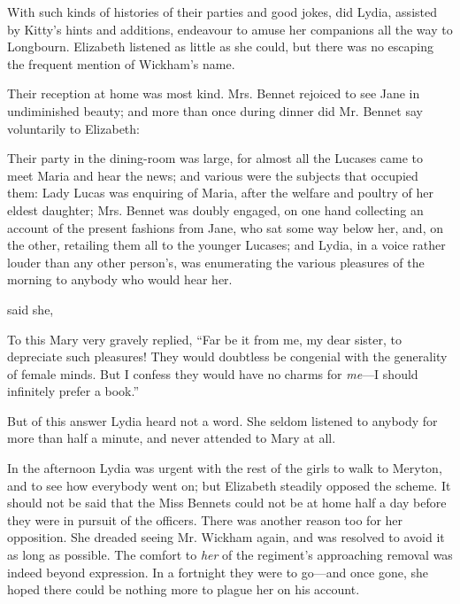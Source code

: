With such kinds of histories of their parties and good jokes, did Lydia, assisted by Kitty's hints and additions, endeavour to amuse her companions all the way to Longbourn. Elizabeth listened as little as she could, but there was no escaping the frequent mention of Wickham's name.

Their reception at home was most kind. Mrs. Bennet rejoiced to see Jane in undiminished beauty; and more than once during dinner did Mr. Bennet say voluntarily to Elizabeth:


Their party in the dining-room was large, for almost all the Lucases came to meet Maria and hear the news; and various were the subjects that occupied them: Lady Lucas was enquiring of Maria, after the welfare and poultry of her eldest daughter; Mrs. Bennet was doubly engaged, on one hand collecting an account of the present fashions from Jane, who sat some way below her, and, on the other, retailing them all to the younger Lucases; and Lydia, in a voice rather louder than any other person's, was enumerating the various pleasures of the morning to anybody who would hear her.

 said she, 

To this Mary very gravely replied, “Far be it from me, my dear sister, to depreciate such pleasures! They would doubtless be congenial with the generality of female minds. But I confess they would have no charms for {\em me}---I should infinitely prefer a book.”

But of this answer Lydia heard not a word. She seldom listened to anybody for more than half a minute, and never attended to Mary at all.

In the afternoon Lydia was urgent with the rest of the girls to walk to Meryton, and to see how everybody went on; but Elizabeth steadily opposed the scheme. It should not be said that the Miss Bennets could not be at home half a day before they were in pursuit of the officers. There was another reason too for her opposition. She dreaded seeing Mr. Wickham again, and was resolved to avoid it as long as possible. The comfort to {\em her} of the regiment's approaching removal was indeed beyond expression. In a fortnight they were to go---and once gone, she hoped there could be nothing more to plague her on his account.

